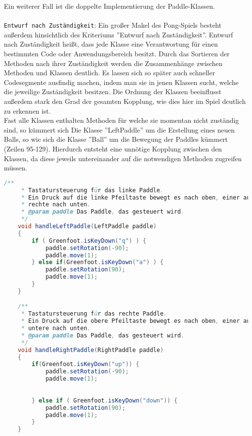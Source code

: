 \documentclass{pi1}
\begin{document}
Ein weiterer Fall ist die doppelte Implementierung der Paddle-Klassen.\\
\\
\texttt{Entwurf nach Zuständigkeit}:
Ein großer Makel des Pong-Spiels besteht außerdem hinsichtlich des Kriteriums ''Entwurf nach Zuständigkeit''. Entwurf nach Zuständigkeit heißt, dass jede Klasse  eine Verantwortung für einen bestimmten Code oder Anwendungsbereich besitzt.
Durch das Sortieren der Methoden nach ihrer Zuständigkeit werden die Zusammenhänge zwischen Methoden und Klassen deutlich.
Es lassen sich so später auch schneller Codesegmente ausfindig machen, indem man sie in jenen Klassen sucht, welche die jeweilige Zuständigkeit besitzen.
Die Ordnung der Klassen beeinflusst außerdem stark den Grad der gesamten Kopplung, wie dies hier im Spiel deutlich zu erkennen ist.\\
Fast alle Klassen enthalten Methoden für welche sie momentan nicht zuständig sind, so kümmert sich Die Klasse ''LeftPaddle'' um die Erstellung eines neuen Balls, so wie sich die Klasse ''Ball'' um die Bewegung der Paddles kümmert (Zeilen 95-129).
Hierdurch entsteht eine unnötige Kopplung zwischen den Klassen, da diese jeweils untereinander auf die notwendigen Methoden zugreifen müssen.
\newpage
\begin{lstlisting}[caption={Klasse Ball Zeile 95-129}, firstnumber=95, language=Java]
        /**
     * Tastatursteuerung für das linke Paddle.
     * Ein Druck auf die linke Pfeiltaste bewegt es nach oben, einer auf die 
     * rechte nach unten.
     * @param paddle Das Paddle, das gesteuert wird.
     */
    void handleLeftPaddle(LeftPaddle paddle)
    {
        if ( Greenfoot.isKeyDown("q") ) {
            paddle.setRotation(-90);
            paddle.move(1);
        } else if(Greenfoot.isKeyDown("a") ) {
            paddle.setRotation(90);
            paddle.move(1);
        }
    }

    /**
     * Tastatursteuerung für das rechte Paddle.
     * Ein Druck auf die obere Pfeiltaste bewegt es nach oben, einer auf die 
     * untere nach unten.
     * @param paddle Das Paddle, das gesteuert wird.
     */
    void handleRightPaddle(RightPaddle paddle)
    {
        if(Greenfoot.isKeyDown("up")) {
            paddle.setRotation(-90);
            paddle.move(1);
            
            
        } else if ( Greenfoot.isKeyDown("down")) {
            paddle.setRotation(90);
            paddle.move(1);
        }
    }
    
\end{lstlisting}
\end{document}
